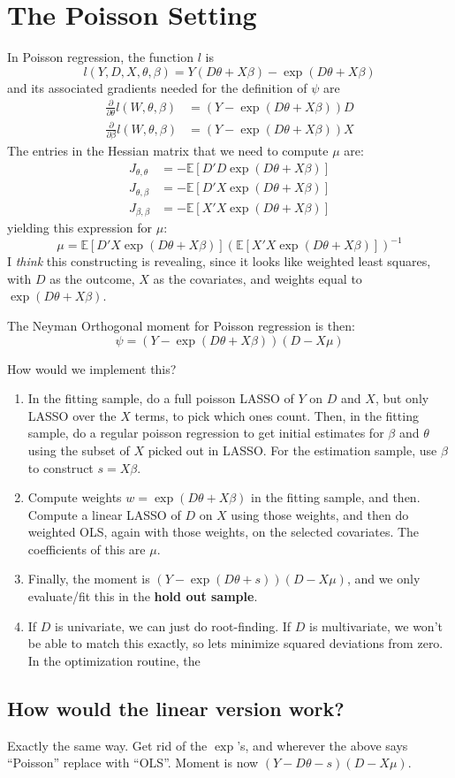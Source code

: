 \documentclass[11pt]{article}
\begin{document}
\section{The Poisson Setting}
In Poisson regression, the function $l$ is
\begin{equation*}
	l(Y, D, X, \theta, \beta) = Y(D\theta + X\beta) - \exp(D\theta + X\beta)
\end{equation*}
and its associated gradients needed for the definition of $\psi$ are
\begin{align*}
	\frac{\partial}{\partial \theta}l(W, \theta, \beta) &= (Y - \exp(D\theta + X\beta)) D \\
	\frac{\partial}{\partial \beta}l(W, \theta, \beta) &= (Y - \exp(D\theta + X\beta)) X
\end{align*}
The entries in the Hessian matrix that we need to compute $\mu$ are:
\begin{align*}
	J_{\theta, \theta} &= -\mathbb{E}\left[D'D\exp(D\theta + X\beta)\right] \\
	J_{\theta, \beta} &= -\mathbb{E}\left[D'X\exp(D\theta + X\beta)\right] \\
	J_{\beta, \beta} &= -\mathbb{E}\left[X'X\exp(D\theta + X\beta)\right]
\end{align*} 
yielding this expression for $\mu$:
\begin{equation*}
	\mu = \mathbb{E}\left[D'X\exp(D\theta + X\beta)\right]\left(\mathbb{E}\left[X'X\exp(D\theta + X\beta)\right]\right)^{-1}
\end{equation*}
I \textit{think} this constructing is revealing, since it looks like weighted least squares, with $D$ as the outcome, $X$ as the covariates, and weights equal to $\exp(D\theta + X\beta)$. 

The Neyman Orthogonal moment for Poisson regression is then:
\begin{equation*}
	\psi = (Y - \exp(D\theta + X\beta))(D - X\mu)
\end{equation*}

How would we implement this?
\begin{enumerate}
	\item In the fitting sample, do a full poisson LASSO of $Y$ on $D$ and $X$, but only LASSO over the $X$ terms, to pick which ones count.  Then, in the fitting sample, do a regular poisson regression to get initial estimates for $\beta$ and $\theta$ using the subset of $X$ picked out in LASSO.  For the estimation sample, use $\beta$ to construct $s = X\beta$.
	\item Compute weights $w = \exp(D\theta + X\beta)$ in the fitting sample, and then.  Compute a linear LASSO of $D$ on $X$ using those weights, and then do weighted OLS, again with those weights, on the selected covariates.  The coefficients of this are $\mu$.
	\item Finally, the moment is $(Y - \exp(D\theta + s))(D - X\mu)$, and we only evaluate/fit this in the \textbf{hold out sample}.
	\item If $D$ is univariate, we can just do root-finding.  If $D$ is multivariate, we won't be able to match this exactly, so lets minimize squared deviations from zero.  In the optimization routine, the  
\end{enumerate}
\subsection{How would the linear version work?}
Exactly the same way.  Get rid of the $\exp$'s, and wherever the above says ``Poisson'' replace with ``OLS''.  Moment is now $(Y - D\theta - s)(D - X\mu)$.
\end{document}
